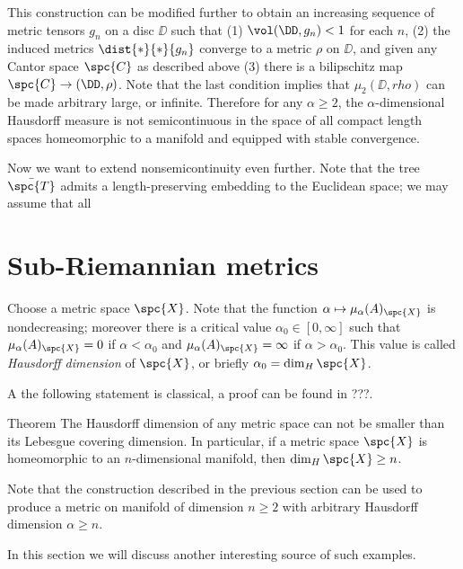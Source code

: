 This construction can be modified further to obtain an increasing sequence of metric tensors $g_n$ on a disc $\DD$ such that (1) $\vol(\DD,g_n)<1$ for each $n$, (2) the induced metrics $\dist{*}{*}{g_n}$ converge to a metric $\rho$ on $\DD$, and given any Cantor space $\spc{C}$ as described above (3) there is a bilipschitz map $\spc{C}\to(\DD,\rho)$.
Note that the last condition implies that $\mu_2(\DD,rho)$ can be made arbitrary large, or infinite.
Therefore for any $\alpha\ge 2$, the $\alpha$-dimensional Hausdorff measure is not semicontinuous in the space of all compact length spaces homeomorphic to a manifold and equipped with stable convergence.

Now we want to extend nonsemicontinuity even further.
Note that the tree $\bar{\spc{T}}$ admits a length-preserving embedding to the Euclidean space; we may assume that all 



\section{Sub-Riemannian metrics}

Choose a metric space $\spc{X}$.
Note that the function $\alpha\mapsto \mu_\alpha(A)_\spc{X}$ is nondecreasing;
moreover there is a critical value $\alpha_0\in[0,\infty]$ such that $\mu_\alpha(A)_\spc{X}=0$ if $\alpha<\alpha_0$ and $\mu_\alpha(A)_\spc{X}=\infty$ if $\alpha>\alpha_0$.
This value is called \emph{Hausdorff dimension} of $\spc{X}$, or briefly $\alpha_0=\dim_H\spc{X}$.

A the following statement is classical, a proof can be found in ???.

\begin{thm}{Theorem}
The Hausdorff dimension of any metric space can not be smaller than its Lebesgue covering dimension.
In particular, if a metric space $\spc{X}$ is homeomorphic to an $n$-dimensional manifold, then $\dim_H\spc{X}\ge n$.
 
\end{thm}

Note that the construction described in the previous section can be used to produce a metric on manifold of dimension $n\ge 2$ with arbitrary Hausdorff dimension $\alpha\ge n$.

In this section we will discuss another interesting source of such examples.


